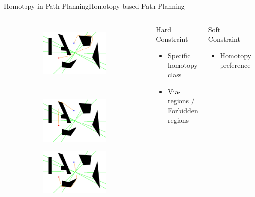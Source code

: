 \begin{frame}{Homotopy in Path-Planning}{Homotopy-based Path-Planning}
\begin{columns}
\begin{figure}
\begin{subfigure}
	\end{subfigure}  
	\begin{subfigure}
		\centering
		\includegraphics[width=.47\textwidth]{figure/all_homotopy_classes/s4.png}
	\end{subfigure}
	\\
	\begin{subfigure}
		\centering
		\includegraphics[width=.47\textwidth]{figure/all_homotopy_classes/s5.png}
	\end{subfigure}	 
	\begin{subfigure}
		\centering
		\includegraphics[width=.47\textwidth]{figure/all_homotopy_classes/s6.png}
	\end{subfigure}	 
\end{figure}
\begin{block}{Hard Constraint}
\begin{itemize}
\item Specific homotopy class
\item Via-regions / Forbidden regions
\end{itemize}
\end{block}
\begin{block}{Soft Constraint}
\begin{itemize}
\item Homotopy preference
\end{itemize}
\end{block}
\end{columns}
	
\end{frame}

